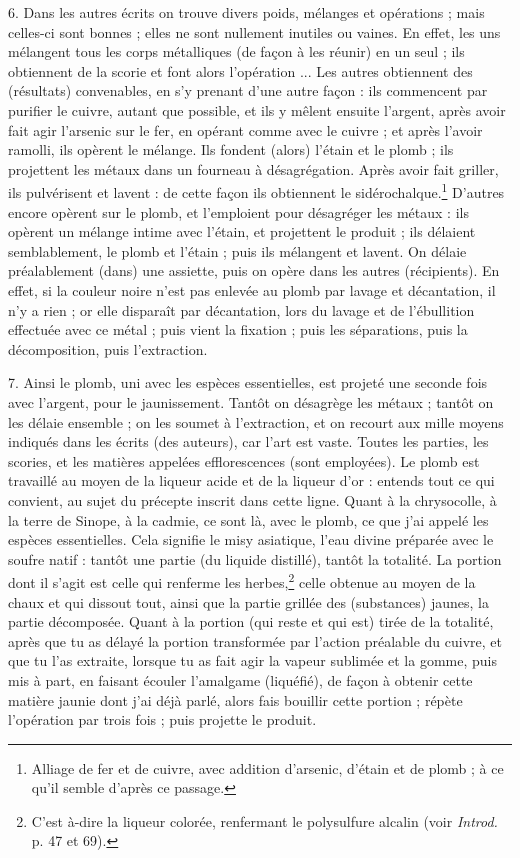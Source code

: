 \documentclass[a4paper, 11pt, oneside, polutonikogreek, french]{article}
\begin{document}
6. Dans les autres écrits on trouve divers poids, mélanges et opérations ; mais celles-ci sont bonnes ; elles ne sont nullement inutiles ou vaines. En effet, les uns mélangent tous les corps métalliques (de façon à les réunir) en un seul ; ils obtiennent de la scorie et font alors l'opération ... Les autres obtiennent des (résultats) convenables, en s'y prenant d'une autre façon : ils commencent par purifier le cuivre, autant que possible, et ils y mêlent ensuite l'argent, après avoir fait agir l'arsenic sur le fer, en opérant comme avec le cuivre ; et après l'avoir ramolli, ils opèrent le mélange. Ils fondent (alors) l'étain et le plomb ; ils projettent les métaux dans un fourneau à désagrégation. Après avoir fait griller, ils pulvérisent et lavent : de cette façon ils obtiennent le sidérochalque.\footnote{Alliage de fer et de cuivre, avec addition d'arsenic, d'étain et de plomb ; à ce qu'il semble d'après ce passage.} D'autres encore opèrent sur le plomb, et l'emploient pour désagréger les métaux : ils opèrent un mélange intime avec l'étain, et projettent le produit ; ils délaient semblablement, le plomb et l'étain ; puis ils mélangent et lavent. On délaie préalablement (dans) une assiette, puis on opère dans les autres (récipients). En effet, si la couleur noire n'est pas enlevée au plomb par lavage et décantation, il n'y a rien ; or elle disparaît par décantation, lors du lavage et de l'ébullition effectuée avec ce métal ; puis vient la fixation ; puis les séparations, puis la décomposition, puis l'extraction.

7. Ainsi le plomb, uni avec les espèces essentielles, est projeté une seconde fois avec l'argent, pour le jaunissement. Tantôt on désagrège les métaux ; tantôt on les délaie ensemble ; on les soumet à l'extraction, et on recourt aux mille moyens indiqués dans les écrits (des auteurs), car l'art est vaste. Toutes les parties, les scories, et les matières appelées efflorescences (sont employées). Le plomb est travaillé au moyen de la liqueur acide et de la liqueur d'or : entends tout ce qui convient, au sujet du précepte inscrit dans cette ligne. Quant à la chrysocolle, à la terre de Sinope, à la cadmie, ce sont là, avec le plomb, ce que j'ai appelé les espèces essentielles. Cela signifie le misy asiatique, l'eau divine préparée avec le soufre natif : tantôt une partie (du liquide distillé), tantôt la totalité. La portion dont il s'agit est celle qui renferme les herbes,\footnote{C'est à-dire la liqueur colorée, renfermant le polysulfure alcalin (voir \emph{Introd.} p. 47 et 69).} celle obtenue au moyen de la chaux et qui dissout tout, ainsi que la partie grillée des (substances) jaunes, la partie décomposée. Quant à la portion (qui reste et qui est) tirée de la totalité, après que tu as délayé la portion transformée par l'action préalable du cuivre, et que tu l'as extraite, lorsque tu as fait agir la vapeur sublimée et la gomme, puis mis à part, en faisant écouler l'amalgame (liquéfié), de façon à obtenir cette matière jaunie dont j'ai déjà parlé, alors fais bouillir cette portion ; répète l'opération par trois fois ; puis projette le produit.
\end{document}
